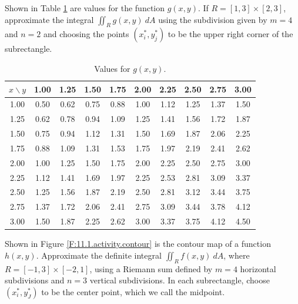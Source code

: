 \begin{activity}
  \item Shown in Table \ref{T:11.1.activity.1} are values for the
    function $g(x,y)$. 
    If $R=[1,3]\times[2,3]$, approximate the integral
    $\iint_Rg(x,y)~dA$ using the subdivision given by $m=4$ and
    $n=2$ and choosing the points $(x_i^*,y_j^*)$ to be the upper
    right corner of the subrectangle.

    \begin{table}
      \begin{center}
        \begin{tabular}{|c||c|c|c|c|c|c|c|c|c|}
          \hline
          $x\backslash y$ &1.00&1.25&1.50&1.75&2.00&2.25&2.50&2.75&3.00\\
          \hline
          \hline
          1.00&0.50&0.62&0.75&0.88&1.00&1.12&1.25&1.37&1.50\\
          \hline
          1.25&0.62&0.78&0.94&1.09&1.25&1.41&1.56&1.72&1.87\\
          \hline
          1.50&0.75&0.94&1.12&1.31&1.50&1.69&1.87&2.06&2.25\\
          \hline
          1.75&0.88&1.09&1.31&1.53&1.75&1.97&2.19&2.41&2.62\\
          \hline
          2.00&1.00&1.25&1.50&1.75&2.00&2.25&2.50&2.75&3.00\\
          \hline
          2.25&1.12&1.41&1.69&1.97&2.25&2.53&2.81&3.09&3.37\\
          \hline
          2.50&1.25&1.56&1.87&2.19&2.50&2.81&3.12&3.44&3.75\\
          \hline
          2.75&1.37&1.72&2.06&2.41&2.75&3.09&3.44&3.78&4.12\\
          \hline
          3.00&1.50&1.87&2.25&2.62&3.00&3.37&3.75&4.12&4.50\\
          \hline
        \end{tabular}
        \caption{Values for $g(x,y)$.}
        \label{T:11.1.activity.1}
      \end{center}
    \end{table}

  \item Shown in Figure \ref{F:11.1.activity.contour} is the contour
    map of a function $h(x,y)$.  Approximate the definite integral
    $\iint_Rf(x,y)~dA$, where $R=[-1,3]\times[-2,1]$, using a
    Riemann sum defined by $m=4$ 
    horizontal subdivisions and $n=3$ vertical subdivisions.  In each
    subrectangle, choose $(x_i^*, y_J^*)$ to be the center point,
    which we call the midpoint.


\end{activity}
